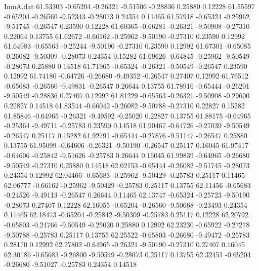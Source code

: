 \begin{filecontents}{ImuA.dat}
  61.53303   -0.65204   -0.26321   -9.51506   -0.28836    0.25880    0.12228
  61.55597   -0.65204   -0.26560   -9.52343   -0.28073    0.24354    0.11465
  61.57918   -0.65324   -0.25962   -9.51745   -0.26547    0.23590    0.12228
  61.60365   -0.66281   -0.26321   -9.50908   -0.27310    0.22064    0.13755
  61.62672   -0.66162   -0.25962   -9.50190   -0.27310    0.23590    0.12992
  61.64983   -0.65563   -0.25244   -9.50190   -0.27310    0.23590    0.12992
  61.67301   -0.65085   -0.26082   -9.50309   -0.28073    0.24354    0.15282
  61.69626   -0.64845   -0.25962   -9.50549   -0.28073    0.25880    0.14518
  61.71965   -0.65324   -0.26321   -9.50549   -0.26547    0.23590    0.12992
  61.74180   -0.64726   -0.26680   -9.49352   -0.26547    0.27407    0.12992
  61.76512   -0.65683   -0.26560   -9.49831   -0.26547    0.26644    0.13755
  61.78916   -0.65444   -0.26201   -9.50549   -0.28836    0.27407    0.12992
  61.81229   -0.65563   -0.26321   -9.50908   -0.29600    0.22827    0.14518
  61.83544   -0.66042   -0.26082   -9.50788   -0.27310    0.22827    0.15282
  61.85846   -0.64965   -0.26321   -9.49592   -0.25020    0.22827    0.13755
  61.88175   -0.64965   -0.25364   -9.49711   -0.25783    0.23590    0.14518
  61.90467   -0.64726   -0.27039   -9.50549   -0.26547    0.25117    0.15282
  61.92791   -0.65444   -0.27876   -9.51147   -0.26547    0.25880    0.13755
  61.95099   -0.64606   -0.26321   -9.50190   -0.26547    0.25117    0.16045
  61.97417   -0.64606   -0.25842   -9.51626   -0.25783    0.26644    0.16045
  61.99839   -0.64965   -0.26680   -9.50549   -0.27310    0.25880    0.14518
  62.02153   -0.65444   -0.26082   -9.51745   -0.28073    0.24354    0.12992
  62.04466   -0.65683   -0.25962   -9.50429   -0.25783    0.25117    0.11465
  62.06777   -0.66162   -0.25962   -9.50429   -0.25783    0.25117    0.13755
  62.11456   -0.65683   -0.24526   -9.49113   -0.26547    0.26644    0.11465
  62.13747   -0.65324   -0.25723   -9.50190   -0.28073    0.27407    0.12228
  62.16055   -0.65204   -0.26560   -9.50668   -0.23493    0.24354    0.11465
  62.18473   -0.65204   -0.25842   -9.50309   -0.25783    0.25117    0.12228
  62.20792   -0.65803   -0.24766   -9.50549   -0.25020    0.25880    0.12992
  62.23230   -0.65922   -0.27278   -9.50788   -0.25783    0.25117    0.13755
  62.25522   -0.65803   -0.26680   -9.49472   -0.25783    0.28170    0.12992
  62.27802   -0.64965   -0.26321   -9.50190   -0.27310    0.27407    0.16045
  62.30186   -0.65683   -0.26800   -9.50549   -0.28073    0.25117    0.13755
  62.32451   -0.65204   -0.26680   -9.51027   -0.25783    0.24354    0.14518

\end{filecontents}
